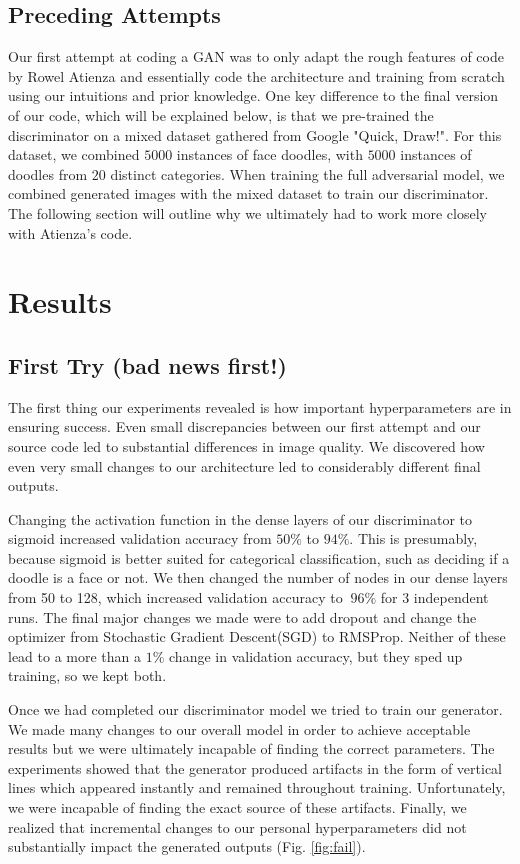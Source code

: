 \documentclass[11pt]{article}
\begin{document}
\subsection{Preceding Attempts}
Our first attempt at coding a GAN was to only adapt the rough features of code by Rowel Atienza \cite{gan} and essentially code the architecture and training from scratch using our intuitions and prior knowledge. One key difference to the final version of our code, which will be explained below, is that we pre-trained the discriminator on a mixed dataset gathered from Google "Quick, Draw!". For this dataset, we combined $5000$ instances of face doodles, with $5000$ instances of doodles from $20$ distinct categories. When training the full adversarial model, we combined generated images with the mixed dataset to train our discriminator. The following section will outline why we ultimately had to work more closely with Atienza's code.

\section{Results}

\subsection{First Try (bad news first!)}
The first thing our experiments revealed is how important hyperparameters
are in ensuring success. Even small discrepancies between our first attempt and our source code led to substantial differences in image quality. We discovered how even very small changes to our architecture led to considerably different final outputs.

Changing the activation function in the dense layers of our discriminator to sigmoid increased validation accuracy from $50 \%$ to
$94\%$. This is presumably, because sigmoid is better suited for categorical classification, such as deciding if a doodle is a face or not.
We then changed the number of nodes in our dense layers from 50 to 128, which increased validation accuracy to $~96\%$ for 3 independent runs.
The final major changes we made were to add dropout and change the optimizer
from Stochastic Gradient Descent(SGD) to RMSProp. Neither of these lead
to a more than a $1\%$ change in validation accuracy, but they sped up
training, so we kept both.

Once we had completed our discriminator model we tried to
train our generator. We made many changes to our overall model in order
to achieve acceptable results but we were ultimately incapable of finding the correct
parameters.
The experiments showed that the generator produced artifacts in the form of vertical lines which appeared instantly and remained throughout training. Unfortunately, we were incapable of finding the exact source of these artifacts. Finally, we realized that incremental changes to our personal hyperparameters did not substantially impact the generated outputs (Fig. \ref{fig:fail}).
\end{document}
